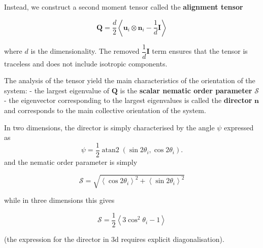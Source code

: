 \documentclass[
  letterpaper,
  enabledeprecatedfontcommands]{report}
\begin{document}
Instead, we construct a second moment tensor called the
\textbf{alignment tensor}

\[
\mathbf{Q}=\dfrac{d}{2}\left\langle\mathbf{u}_i \otimes \mathbf{n}_i-\dfrac{1}{d}\mathbf{I}\right\rangle
\]

where \(d\) is the dimensionality. The removed
\(\dfrac{1}{d}\mathbf{I}\) term ensures that the tensor is traceless and
does not include isotropic components.

The analysis of the tensor yield the main characteristics of the
orientation of the system: - the largest eigenvalue of \(\mathbf{Q}\) is
the \textbf{scalar nematic order parameter} \(\mathcal{S}\) - the
eigenvector corresponding to the largest eigenvalues is called the
\textbf{director} \(\mathbf{n}\) and corresponds to the main collective
orientation of the system.

In two dimensions, the director is simply characterised by the angle
\(\psi\) expressed as \[
\psi = \frac{1}{2} \operatorname{atan2}(\sin{2\theta_i}, \cos{2\theta_i}).
\] and the nematic order parameter is simply

\[
\mathcal{S}=\sqrt{\left\langle\cos 2 \theta_i\right\rangle^2+\left\langle\sin 2 \theta_i\right\rangle^2}
\]


while in three dimensions this gives

\[
\mathcal{S}=\dfrac{1}{2} \left\langle 3\cos ^2 \theta_i-1\right\rangle
\]

(the expression for the director in 3d requires explicit
diagonalisation).
\end{document}
